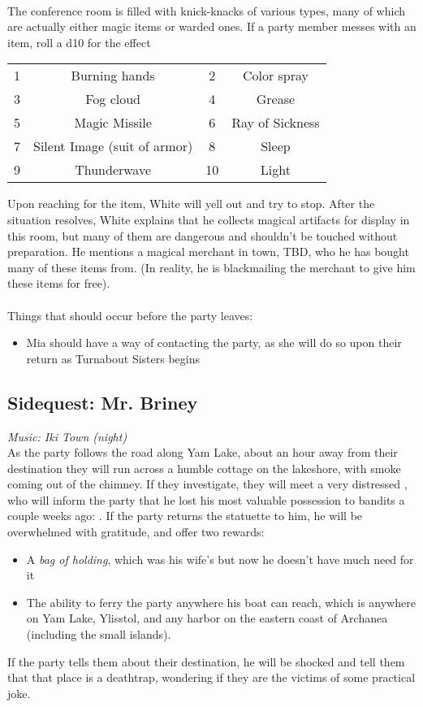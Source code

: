 \\
The conference room is filled with knick-knacks of various types, many of which are actually either magic items or warded ones. If a party member messes with an item, roll a d10 for the effect
\begin{tabular}{c c|c c}
1 & Burning hands & 2 & Color spray \\
3 & Fog cloud & 4 & Grease \\
5 & Magic Missile & 6 & Ray of Sickness \\
7 & Silent Image (suit of armor) & 8 & Sleep \\
9 & Thunderwave & 10 & Light \end{tabular}
Upon reaching for the item, White will yell out and try to stop. After the situation resolves, White explains that he collects magical artifacts for display in this room, but many of them are dangerous and shouldn't be touched without preparation. He mentions a magical merchant in town, TBD, who he has bought many of these items from. (In reality, he is blackmailing the merchant to give him these items for free).\\
\\
Things that should occur before the party leaves:
\begin{itemize}
\item Mia should have a way of contacting the party, as she will do so upon their return as Turnabout Sisters begins
\end{itemize}
\subsection{Sidequest: Mr. Briney}
\textit{Music: Iki Town (night)}\\
As the party follows the road along Yam Lake, about an hour away from their destination they will run across a humble cottage on the lakeshore, with smoke coming out of the chimney. If they investigate, they will meet a very distressed , who will inform the party that he lost his most valuable possession to bandits a couple weeks ago: . If the party returns the statuette to him, he will be overwhelmed with gratitude, and offer two rewards:
\begin{itemize}
\item A \textit{bag of holding}, which was his wife's but now he doesn't have much need for it
\item The ability to ferry the party anywhere his boat can reach, which is anywhere on Yam Lake, Ylisstol, and any harbor on the eastern coast of Archanea (including the small islands).
\end{itemize}
If the party tells them about their destination, he will be shocked and tell them that that place is a deathtrap, wondering if they are the victims of some practical joke.
